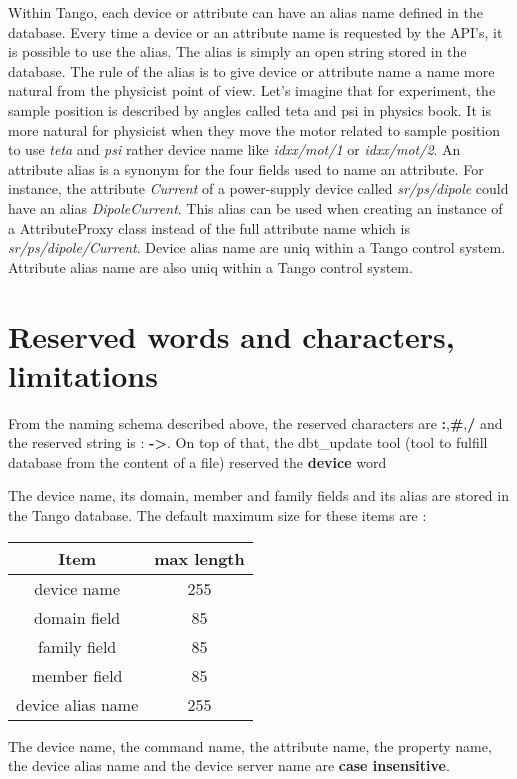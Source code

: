 Within Tango, each device or attribute can have an alias name defined
in the database. Every time a device or an attribute name is requested
by the API's, it is possible to use the alias. The alias is simply
an open string stored in the database. The rule of the alias is to
give device or attribute name a name more natural from the physicist
point of view. Let's imagine that for experiment, the sample position
is described by angles called teta and psi in physics book. It is
more natural for physicist when they move the motor related to sample
position to use \emph{teta} and \emph{psi} rather device name like
\emph{idxx/mot/1} or \emph{idxx/mot/2}. An attribute alias is a synonym
for the four fields used to name an attribute. For instance, the attribute
\emph{Current} of a power-supply device called \emph{sr/ps/dipole}
could have an alias \emph{DipoleCurrent}. This alias can be used when
creating an instance of a AttributeProxy class instead of the full
attribute name which is \emph{sr/ps/dipole/Current}. Device alias
name are uniq within a Tango control system. Attribute alias name
are also uniq within a Tango control system.


\section{Reserved words and characters, limitations}

From the naming schema described above, the reserved characters are
\textbf{:},\textbf{\#},\textbf{/} and the reserved string is : \textbf{->}.
On top of that, the dbt\_update tool (tool to fulfill database from
the content of a file) reserved the \textbf{device} word

The device name, its domain, member and family fields and its alias
are stored in the Tango database. The default maximum size for these
items are :

\vspace{0.3cm}


\begin{center}
\begin{longtable}{|c|c|}
\hline 
Item & max length\tabularnewline
\hline 
\hline 
device name & 255\tabularnewline
\hline 
domain field & 85\tabularnewline
\hline 
family field & 85\tabularnewline
\hline 
member field & 85\tabularnewline
\hline 
device alias name & 255\tabularnewline
\hline 
\end{longtable}
\par\end{center}

\vspace{0.3cm}


The device name, the command name, the attribute name, the property
name, the device alias name and the device server name are \textbf{case
insensitive}.
